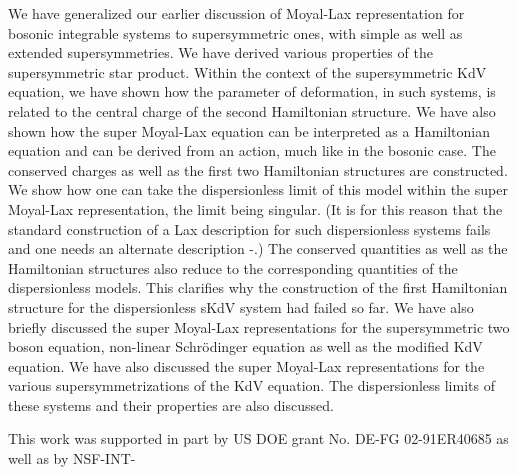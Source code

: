 \documentclass[a4paper,11pt]{article}
\begin{document}
We have generalized our earlier discussion of Moyal-Lax representation
for bosonic integrable systems \cite{13} to supersymmetric ones, with
simple  as
well as extended supersymmetries. We have derived various properties
of the supersymmetric star product. Within the context of the \coordHE{}
supersymmetric KdV equation, we have shown how the parameter of
deformation, in such systems, is related to the central charge of the
second Hamiltonian structure. We have also shown how the super
Moyal-Lax equation can be interpreted as a Hamiltonian equation and
can be derived from an action, much like in the bosonic case. The
conserved charges as well as the first two Hamiltonian structures are
constructed. We show how one can take the dispersionless limit of this
model within the super Moyal-Lax representation, the limit being
singular. (It is for this reason that the standard construction of a
Lax description for such dispersionless systems fails and one needs an
alternate description \cite{16}-\cite{17}.) The conserved quantities
as well as the Hamiltonian structures also reduce to the corresponding
quantities of the dispersionless models. This clarifies why the
construction of the first Hamiltonian structure for the dispersionless
sKdV system had failed so far. We have also briefly discussed the
super Moyal-Lax representations for the \coordHE{} supersymmetric two
boson equation, non-linear Schr\"{o}dinger equation as well as the
modified KdV equation. We have also discussed the super Moyal-Lax
representations for the various \coordHE{} supersymmetrizations of the KdV
equation. The dispersionless limits of these systems and their
properties are also discussed. 
  
This work was supported in part by US DOE grant No. DE-FG 02-91ER40685 as
well as by NSF-INT-
\end{document}
